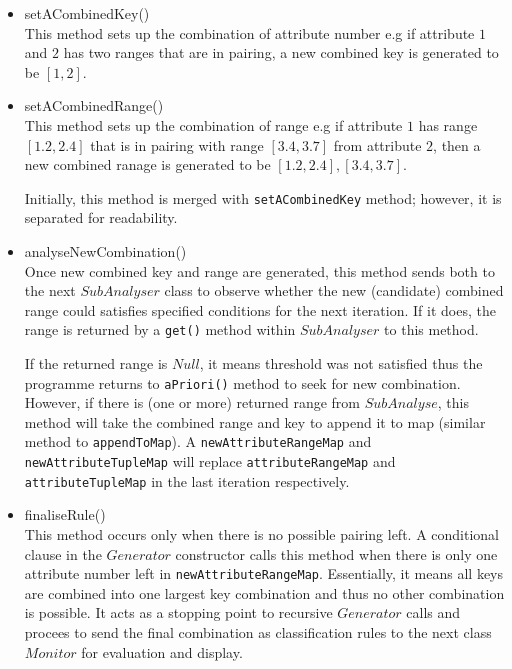 \begin{description}
\begin{itemize}
	\item{setACombinedKey()} \\
	This method sets up the combination of attribute number e.g if attribute $1$ and $2$ has two ranges that are in pairing, a new combined key is generated to be $[1, 2]$.
	
	\item{setACombinedRange()} \\
	This method sets up the combination of range e.g if attribute $1$ has range $[1.2, 2.4]$ that is in pairing with range $[3.4,3.7]$ from attribute $2$, then a new combined ranage is generated to be ${[1.2, 2.4], [3.4, 3.7]}$.
	
	Initially, this method is merged with \texttt{setACombinedKey} method; however, it is separated for readability.
	
	\item{analyseNewCombination()} \\
	 Once new combined key and range are generated, this method sends both to the next $SubAnalyser$ class to observe whether the new (candidate) combined range could satisfies specified conditions for the next iteration. If it does, the range is returned by a \texttt{get()} method within $SubAnalyser$ to this method. 
	 
	 If the returned range is $Null$, it means threshold was not satisfied thus the programme returns to \texttt{aPriori()} method to seek for new combination. However, if there is (one or more) returned range from $SubAnalyse$, this method will take the combined range and key to append it to map (similar method to \texttt{appendToMap}). A \texttt{newAttributeRangeMap} and \texttt{newAttributeTupleMap} will replace \texttt{attributeRangeMap} and \texttt{attributeTupleMap} in the last iteration respectively.
	
	\item{finaliseRule()} \\
	This method occurs only when there is no possible pairing left. A conditional clause in the $Generator$ constructor calls this method when there is only one attribute number left in \texttt{newAttributeRangeMap}. Essentially, it means all keys are combined into one largest key combination and thus no other combination is possible. It acts as a stopping point to recursive $Generator$ calls and procees to send the final combination as classification rules to the next class $Monitor$ for evaluation and display.
	
\end{itemize}


\end{description}
